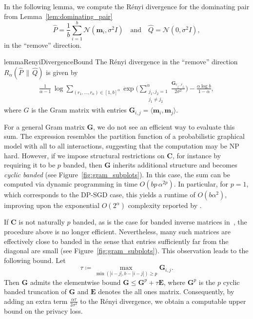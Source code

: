 \documentclass{article}
\theoremstyle{plain}
\theoremstyle{definition}
\theoremstyle{remark}
\begin{document}
In the following lemma, we compute the Rényi divergence for the dominating pair from Lemma~\ref{lem:dominating_pair} 
\[
\hat{P} = \frac{1}{b}\sum_{i=1}^{b} \mathcal{N}(\mathbf{m}_i, \sigma^2 I)
\quad\text{and}\quad
\hat{Q} = \mathcal{N}(0, \sigma^2 I),
\]
in the ``remove'' direction.

\begin{restatable}{lemma}{RenyiDivergenceBound}
\label{lem:renyi-bound}
The Rényi divergence in the ``remove'' direction $R_\alpha(\hat{P}\,\|\,\hat{Q})$ is given by
\begin{equation}
\begin{aligned}
\label{eq:divergence_add}
\frac{1}{\alpha - 1}\,
\log\!\!\sum_{(r_1,\dots,r_\alpha)\in[1,b]^\alpha}
\!\!\!\!\!\exp\bigg(\!
  \sum_{\substack{j_1,j_2=1\\ j_1\ne j_2}}^\alpha
  \frac{\mathbf{G}_{r_{j_1}, r_{j_2}}}{2\sigma^2}
\!\bigg)-\frac{\alpha \log b}{1-\alpha},
\end{aligned}
\end{equation}
where $G$ is the Gram matrix with entries $\mathbf{G}_{i,j} = \langle \mathbf{m}_i, \mathbf{m}_j\rangle$.
\end{restatable}


For a general Gram matrix $\mathbf{G}$, we do not see an efficient way to evaluate this sum. The expression resembles the partition function of a probabilistic graphical model with all to all interactions, suggesting that the computation may be NP hard. However, if we impose structural restrictions on $\mathbf{C}$, for instance by requiring it to be $p$ banded, then $\mathbf{G}$ inherits additional structure and becomes \emph{cyclic banded} (see Figure~\ref{fig:gram_subplots}). In this case, the sum can be computed via dynamic programming in time $O\!\left(bp\,\alpha^{2p}\right)$. In particular, for $p=1$, which corresponds to the DP-SGD case, this yields a runtime of $O(b\alpha^2)$, improving upon the exponential $O(2^\alpha)$ complexity reported by \citet{feldman2025privacy}.

If $\mathbf{C}$ is not naturally $p$ banded, as is the case for banded inverse matrices in~\citet{kalinin2025back}, the procedure above is no longer efficient. Nevertheless, many such matrices are effectively close to banded in the sense that entries sufficiently far from the diagonal are small (see Figure~\ref{fig:gram_subplots}). This observation leads to the following bound. Let
\[
\tau \coloneqq \max_{\min(|i-j|, b - |i-j|)\ge p} \mathbf{G}_{i,j}.
\]
Then $\mathbf{G}$ admits the elementwise bound $\mathbf{G} \le \mathbf{G}^{p} + \tau \mathbf{E}$, where $\mathbf{G}^{p}$ is the $p$ cyclic banded truncation of $\mathbf{G}$ and $\mathbf{E}$ denotes the all ones matrix. Consequently, by adding an extra term $\frac{\alpha \tau}{2\sigma^2}$ to the Rényi divergence, we obtain a computable upper bound on the privacy loss.
\end{document}

